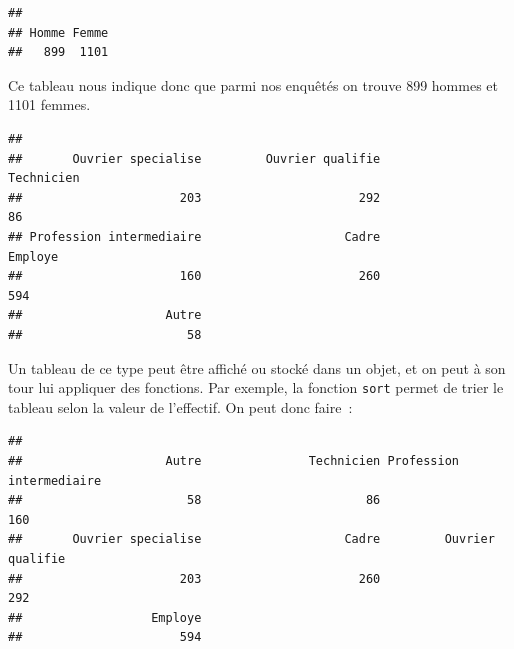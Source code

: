 \documentclass[12pt,]{book}
\newenvironment{Shaded}{\begin{snugshade}}{\end{snugshade}}
\newcommand{\KeywordTok}[1]{\textcolor[rgb]{0.27,0.27,0.27}{\textbf{#1}}}
\newcommand{\NormalTok}[1]{#1}
\newcommand{\OperatorTok}[1]{\textcolor[rgb]{0.43,0.43,0.43}{\textbf{#1}}}
\newcommand{\StringTok}[1]{\textcolor[rgb]{0.5,0.5,0.5}{#1}}
\begin{document}
\begin{Shaded}
\end{Shaded}

\begin{verbatim}
## 
## Homme Femme 
##   899  1101
\end{verbatim}

Ce tableau nous indique donc que parmi nos enquêtés on trouve 899 hommes et 1101 femmes.

\begin{Shaded}
\end{Shaded}

\begin{verbatim}
## 
##       Ouvrier specialise         Ouvrier qualifie               Technicien 
##                      203                      292                       86 
## Profession intermediaire                    Cadre                  Employe 
##                      160                      260                      594 
##                    Autre 
##                       58
\end{verbatim}

Un tableau de ce type peut être affiché ou stocké dans un objet, et on peut à son tour lui appliquer des fonctions. Par exemple, la fonction \texttt{sort} permet de trier le tableau selon la valeur de l'effectif. On peut donc faire~:

\begin{Shaded}
\end{Shaded}

\begin{verbatim}
## 
##                    Autre               Technicien Profession intermediaire 
##                       58                       86                      160 
##       Ouvrier specialise                    Cadre         Ouvrier qualifie 
##                      203                      260                      292 
##                  Employe 
##                      594
\end{verbatim}
\end{document}
